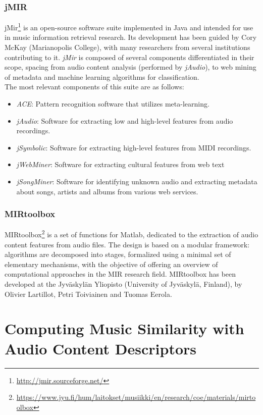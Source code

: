 \subsubsection*{jMIR}
jMir\footnote{\url{http://jmir.sourceforge.net/}} is an open-source software suite implemented in Java and intended for use in music information retrieval research. Its development has been guided by Cory McKay (Marianopolis College), with many researchers from several institutions contributing to it. \textit{jMir} is composed of several components differentiated in their scope, spacing from audio content analysis (performed by \textit{jAudio}), to web mining of metadata and machine learning algorithms for classification. \\ The most relevant components of this suite are as follows:
\begin{itemize}
\item \textit{ACE}: Pattern recognition software that utilizes meta-learning. 
\item \textit{jAudio}: Software for extracting low and high-level features from audio recordings.
\item \textit{jSymbolic}: Software for extracting high-level features from MIDI recordings.
\item \textit{jWebMiner}: Software for extracting cultural features from web text
\item \textit{jSongMiner}: Software for identifying unknown audio and extracting metadata about songs, artists and albums from various web services.
\end{itemize}


\subsubsection*{MIRtoolbox}
MIRtoolbox\footnote{\url{https://www.jyu.fi/hum/laitokset/musiikki/en/research/coe/materials/mirtoolbox}} is a set of functions for Matlab, dedicated to the extraction of audio content features from audio files. The design is based on a modular framework: algorithms are decomposed into stages, formalized using a minimal set of elementary mechanisms, with the objective of offering an overview of computational approaches in the MIR research field. MIRtoolbox has been developed at the Jyväskylän Yliopisto (University of Jyväskylä, Finland), by Olivier Lartillot, Petri Toiviainen and Tuomas Eerola.


\section{Computing Music Similarity with Audio Content Descriptors}

